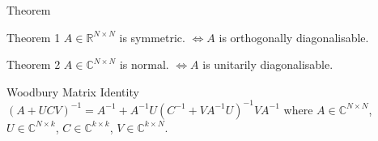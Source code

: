 \documentclass[xcolor=dvipsnames,aspectratio=169]{beamer}
\begin{document}
            \begin{frame}{Theorem}
                \begin{block}{Theorem 1}
                    $A \in \mathbb{R}^{N \times N}$ is symmetric. $\iff A$ is orthogonally diagonalisable.
                \end{block}

                \begin{block}{Theorem 2}
                    $A \in \mathbb{C}^{N \times N}$ is normal. $\iff A$ is unitarily diagonalisable.
                \end{block}

                \begin{block}{Woodbury Matrix Identity}
                    $(A + UCV)^{-1} = A^{-1} + A^{-1} U (C^{-1} + VA^{-1}U)^{-1} VA^{-1}$ where $A \in \mathbb{C}^{N \times N}$, $U \in \mathbb{C}^{N \times k}$, $C \in \mathbb{C}^{k \times k}$, $V \in \mathbb{C}^{k \times N}$. 
                \end{block}
            \end{frame}
\end{document}
